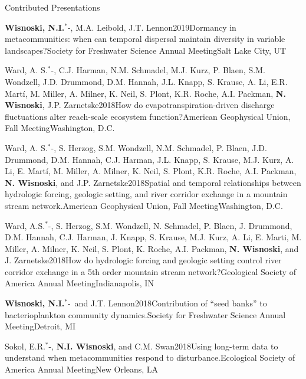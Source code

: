 \documentclass{resume} %
\newcommand{\Star}{\ensuremath{^*}\kern-\scriptspace}
\begin{document}
\begin{rhangSection}{Contributed Presentations}
\begin{Presentation}{{\bf Wisnoski, N.I.}\Star, M.A. Leibold, J.T. Lennon}{2019}{Dormancy in metacommunities: when can temporal dispersal maintain diversity in variable landscapes?}{Society for Freshwater Science Annual Meeting}{Salt Lake City, UT}
\end{Presentation}
  
\begin{Presentation}{Ward, A. S.\Star, C.J. Harman, N.M. Schmadel, M.J. Kurz, P. Blaen, S.M. Wondzell, J.D. Drummond, D.M. Hannah, J.L. Knapp, S. Krause, A. Li, E.R. Martí, M. Miller, A. Milner, K. Neil, S. Plont, K.R. Roche, A.I. Packman, {\bf N. Wisnoski}, J.P. Zarnetske}{2018}{How do evapotranspiration-driven discharge fluctuations alter reach-scale ecosystem function?}{American Geophysical Union, Fall Meeting}{Washington, D.C.}
\end{Presentation}
  
\begin{Presentation}{Ward, A. S.\Star, S. Herzog, S.M. Wondzell, N.M. Schmadel, P. Blaen, J.D. Drummond, D.M. Hannah, C.J. Harman, J.L. Knapp, S. Krause, M.J. Kurz, A. Li, E. Martí, M. Miller, A. Milner, K. Neil, S. Plont, K.R. Roche, A.I. Packman, {\bf N. Wisnoski}, and J.P. Zarnetske}{2018}{Spatial and temporal relationships between hydrologic forcing, geologic setting, and river corridor exchange in a mountain stream network.}{American Geophysical Union, Fall Meeting}{Washington, D.C.}
\end{Presentation}
  
\begin{Presentation}{Ward, A.S.\Star, S. Herzog, S.M. Wondzell, N. Schmadel, P. Blaen, J. Drummond, D.M. Hannah, C.J. Harman, J. Knapp, S. Krause, M.J. Kurz, A. Li, E. Marti, M. Miller, A. Milner, K. Neil, S. Plont, K. Roche, A.I. Packman, {\bf N. Wisnoski}, and J. Zarnetske}{2018}{How do hydrologic forcing and geologic setting control river corridor exchange in a 5th order mountain stream network?}{Geological Society of America Annual Meeting}{Indianapolis, IN}
\end{Presentation}
  
\begin{Presentation}{{\bf Wisnoski, N.I.}\Star\ and J.T. Lennon}{2018}{Contribution of \enquote{seed banks} to bacterioplankton community dynamics.}{Society for Freshwater Science Annual Meeting}{Detroit, MI}
\end{Presentation}
  
\begin{Presentation}{Sokol, E.R.\Star, {\bf N.I. Wisnoski}, and C.M. Swan}{2018}{Using long-term data to understand when metacommunities respond to disturbance.}{Ecological Society of America Annual Meeting}{New Orleans, LA}
\end{Presentation}


\end{rhangSection}
\end{document}

